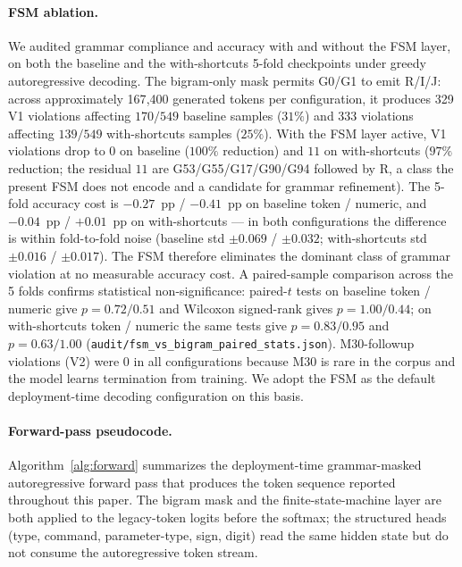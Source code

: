 \documentclass[sensors,article,submit,moreauthors,pdftex]{Definitions/mdpi}
\begin{document}
\paragraph{FSM ablation.} We audited grammar compliance and accuracy with and without the FSM layer, on both the baseline and the with-shortcuts 5-fold checkpoints under greedy autoregressive decoding. The bigram-only mask permits G0/G1 to emit R/I/J: across approximately 167{,}400 generated tokens per configuration, it produces 329 V1 violations affecting $170 / 549$ baseline samples ($31\%$) and 333 violations affecting $139 / 549$ with-shortcuts samples ($25\%$). With the FSM layer active, V1 violations drop to $0$ on baseline ($100\%$ reduction) and $11$ on with-shortcuts ($97\%$ reduction; the residual $11$ are G53/G55/G17/G90/G94 followed by R, a class the present FSM does not encode and a candidate for grammar refinement). The 5-fold accuracy cost is $-0.27$~pp / $-0.41$~pp on baseline token / numeric, and $-0.04$~pp / $+0.01$~pp on with-shortcuts --- in both configurations the difference is within fold-to-fold noise (baseline std $\pm 0.069$ / $\pm 0.032$; with-shortcuts std $\pm 0.016$ / $\pm 0.017$). The FSM therefore eliminates the dominant class of grammar violation at no measurable accuracy cost. A paired-sample comparison across the 5 folds confirms statistical non-significance: paired-$t$ tests on baseline token / numeric give $p=0.72 / 0.51$ and Wilcoxon signed-rank gives $p=1.00 / 0.44$; on with-shortcuts token / numeric the same tests give $p=0.83 / 0.95$ and $p=0.63 / 1.00$ (\texttt{audit/fsm\_vs\_bigram\_paired\_stats.json}). M30-followup violations (V2) were $0$ in all configurations because M30 is rare in the corpus and the model learns termination from training. We adopt the FSM as the default deployment-time decoding configuration on this basis.

\paragraph{Forward-pass pseudocode.} Algorithm~\ref{alg:forward} summarizes the deployment-time grammar-masked autoregressive forward pass that produces the token sequence reported throughout this paper. The bigram mask and the finite-state-machine layer are both applied to the legacy-token logits before the softmax; the structured heads (type, command, parameter-type, sign, digit) read the same hidden state but do not consume the autoregressive token stream.
\end{document}

